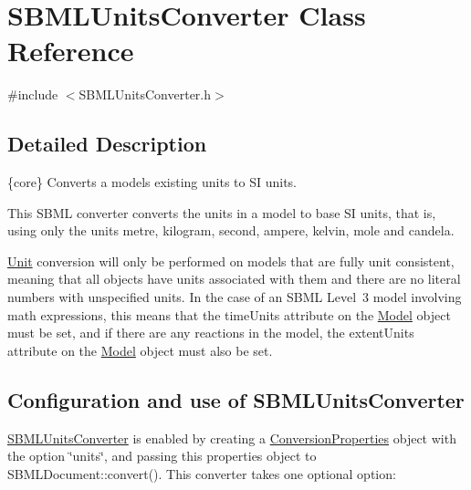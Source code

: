 \hypertarget{class_s_b_m_l_units_converter}{}\section{S\+B\+M\+L\+Units\+Converter Class Reference}
\label{class_s_b_m_l_units_converter}


{\ttfamily \#include $<$S\+B\+M\+L\+Units\+Converter.\+h$>$}



\subsection{Detailed Description}
\{core\} Converts a model\textquotesingle{}s existing units to SI units.



This S\+B\+ML converter converts the units in a model to base SI units, that is, using only the units metre, kilogram, second, ampere, kelvin, mole and candela.

\hyperlink{class_unit}{Unit} conversion will only be performed on models that are fully unit consistent, meaning that all objects have units associated with them and there are no literal numbers with unspecified units. In the case of an S\+B\+ML Level~3 model involving math expressions, this means that the {\ttfamily time\+Units} attribute on the \hyperlink{class_model}{Model} object must be set, and if there are any reactions in the model, the {\ttfamily extent\+Units} attribute on the \hyperlink{class_model}{Model} object must also be set.\hypertarget{class_s_b_m_l_units_converter_SBMLUnitsConverter-usage}{}\subsection{Configuration and use of S\+B\+M\+L\+Units\+Converter}\label{class_s_b_m_l_units_converter_SBMLUnitsConverter-usage}
\hyperlink{class_s_b_m_l_units_converter}{S\+B\+M\+L\+Units\+Converter} is enabled by creating a \hyperlink{class_conversion_properties}{Conversion\+Properties} object with the option {\ttfamily \char`\"{}units\char`\"{}}, and passing this properties object to S\+B\+M\+L\+Document\+::convert(). This converter takes one optional option\+:


